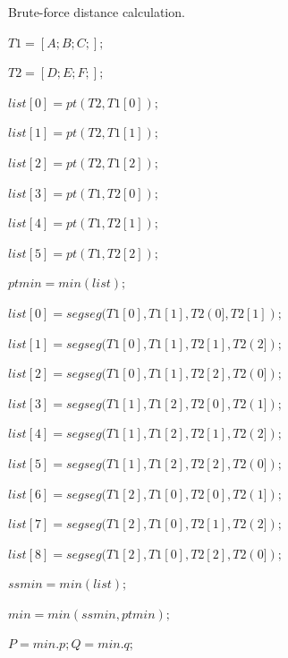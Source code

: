 \begin{algorithm}
 \caption{Brute-force distance calculation.} \label{algorithm:bf}
 \begin{algorithmic}[1]
	
		\State $T1=[A;B;C;];$
		
		\State $T2=[D;E;F;];$

		\State $list[0]= pt(T2, T1[0]);$

		\State $list[1]= pt(T2, T1[1]);$

		\State $list[2]= pt(T2, T1[2]);$

		\State $list[3]= pt(T1, T2[0]);$

		\State $list[4]= pt(T1, T2[1]);$

		\State $list[5]= pt(T1, T2[2]);$

		\State $ptmin = min(list);$

		\State $list[0]=segseg(T1[0],T1[1],T2(0],T2[1]);$

		\State $list[1]=segseg(T1[0],T1[1],T2[1],T2(2]);$

		\State $list[2]=segseg(T1[0],T1[1],T2[2],T2(0]);$

		\State $list[3]=segseg(T1[1],T1[2],T2[0],T2(1]);$

		\State $list[4]=segseg(T1[1],T1[2],T2[1],T2(2]);$

		\State $list[5]=segseg(T1[1],T1[2],T2[2],T2(0]);$

		\State $list[6]=segseg(T1[2],T1[0],T2[0],T2(1]);$

		\State $list[7]=segseg(T1[2],T1[0],T2[1],T2(2]);$

		\State $list[8]=segseg(T1[2],T1[0],T2[2],T2(0]);$

		\State $ssmin = min(list);$

		\State $min = min(ssmin, ptmin);$

		\State $P = min.p; Q = min.q;$
	\EndFunction
 \end{algorithmic}
\end{algorithm} 


